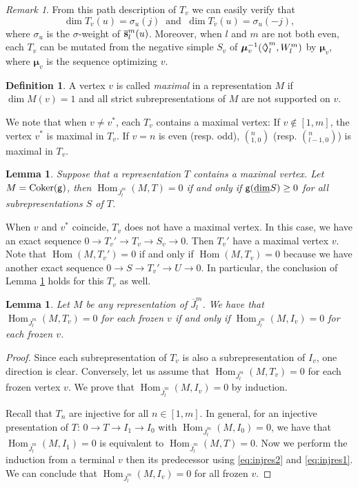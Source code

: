 \documentclass{amsart}
\newtheorem{lemma}[theorem]{Lemma}
\theoremstyle{definition}
\newtheorem{definition}[theorem]{Definition}
\theoremstyle{remark}
\newtheorem{remark}[theorem]{Remark}
\numberwithin{equation}{section}
\DeclareMathOperator{\Coker}{Coker}
\DeclareMathOperator{\Hom}{Hom}
\renewcommand{\b}[1]{\bold{#1}}
\newcommand{\bs}[1]{\boldsymbol{#1}}
\newcommand{\br}[1]{\overline{#1}}
\newcommand{\dv}{\underline{\dim}}
\newcommand{\g}{{\sf g}}
\newcommand{\Diamondsh}{\mathrel{\Diamond\!\!\raisebox{0.45pt}{$\rangle$}}}
\begin{document}
\begin{remark} From this path description of $T_v$ we can easily verify that 
	$$\dim T_v(u) = {\sigma}_u(j)\ \text{ and }\ \dim T_{\check{v}}(u) = {\sigma}_u(-j),$$
	where $\sigma_u$ is the $\sigma$-weight of $\br{\b{s}}_l^m(u)$.
Moreover, when $l$ and $m$ are not both even, each $T_v$ can be mutated from the negative simple $S_v$ of $\bs{\mu}_v^{-1}(\Diamondsh_l^m,W_l^m)$ by $\bs{\mu}_v$,
where $\bs{\mu}_v$ is the sequence optimizing $v$.
\end{remark}


\begin{definition} A vertex $v$ is called {\em maximal} in a representation $M$
	if $\dim M(v)=1$ and all strict subrepresentations of $M$ are not supported on $v$.
\end{definition}
\noindent We note that when $v\neq v^*$, each $T_v$ contains a maximal vertex:
If $v\notin [1,m]$, the vertex $v^*$ is maximal in $T_v$. 
If $v=n$ is even (resp. odd), $(_{1,0}^n)$ (resp. $(_{l-1,0}^n)$) is maximal in $T_v$.


\begin{lemma}\cite[Lemma 6.5]{Fs1} \label{L:hom=0} Suppose that a representation $T$ contains a maximal vertex. Let $M=\Coker(\g)$, 
	then $\Hom_{\br{J}_l^m}(M,T)=0$ if and only if $\g(\dv S)\geq 0$ for all subrepresentations $S$ of $T$.
\end{lemma}

\noindent When $v$ and $v^*$ coincide, $T_v$ does not have a maximal vertex. In this case, we have an exact sequence
$0\to T_v'\to T_v\to S_v\to 0.$
Then $T_v'$ have a maximal vertex $v$.
Note that $\Hom(M,T_v')=0$ if and only if $\Hom(M,T_v)=0$ because we have another exact sequence
$0\to S\to T_v'\to U\to 0.$
In particular, the conclusion of Lemma \ref{L:hom=0} holds for this $T_v$ as well.


\begin{lemma} \label{L:TIequi} Let $M$ be any representation of $\br{J}_l^m$. We have that $\Hom_{\br{J}_l^m}(M,T_v)=0$ for each frozen $v$ if and only if $\Hom_{\br{J}_l^m}(M,I_v)=0$ for each frozen $v$.
\end{lemma}

\begin{proof}  Since each subrepresentation of $T_v$ is also a subrepresentation of $I_v$, one direction is clear.
	Conversely, let us assume that $\Hom_{\br{J}_l^m}(M,T_v)=0$ for each frozen vertex $v$.
	We prove that $\Hom_{\br{J}_l^m}(M,I_v)=0$ by induction.
	
	Recall that $T_n$ are injective for all $n\in [1,m]$.
	In general, for an injective presentation of $T$: $0\to T\to I_1\to I_0$ with $\Hom_{\br{J}_l^m}(M,I_0)=0$,
	we have that $\Hom_{\br{J}_l^m}(M,I_1)=0$ is equivalent to $\Hom_{\br{J}_l^m}(M,T)=0$.
	Now we perform the induction from a terminal $v$ then its predecessor using \eqref{eq:injres2} and \eqref{eq:injres1}.
	We can conclude that $\Hom_{\br{J}_l^m}(M,I_v)=0$ for all frozen $v$.
\end{proof}
\end{document}

